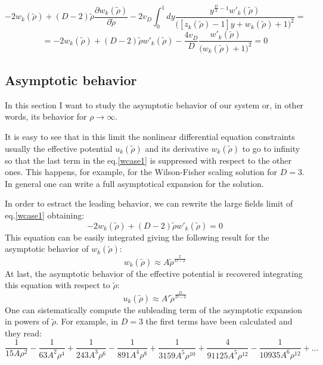 \begin{equation*}
-2 w_k(\widetilde{\rho}) + (D-2)\widetilde{\rho}\frac{\partial w_k(\widetilde{\rho})}{\partial \widetilde{\rho}} - 2v_D\int_0^1 dy \frac{y^{\frac{D}{2}-1} w'_k(\widetilde{\rho})}{\big([z_k(\widetilde{\rho}) -1 ]y + w_k(\widetilde{\rho})+1\big)^2}  = 
\end{equation*}
\begin{equation}\label{wcase1}
 = -2 w_k(\widetilde{\rho}) + (D-2)\widetilde{\rho}w'_k(\widetilde{\rho}) - \frac{4v_D}{D} \frac{w'_k(\widetilde{\rho})}{\big(w_k(\widetilde{\rho})+1\big)^2}=0
\end{equation}

\subsection{Asymptotic behavior}
In this section I want to study the asymptotic behavior of our system or, in other words, its behavior for $\rho \to \infty$. 

It is easy to see that in this limit the nonlinear differential equation constraints usually the effective potential $u_k(\widetilde{\rho})$ and its derivative $w_k(\widetilde{\rho})$ 
to go to infinity so that the last term in the eq.\eqref{wcase1} is suppressed with respect to the other ones. This happens, for example, 
for the Wilson-Fisher scaling solution for $D= 3$. In general one can write a full asymptotical expansion for the solution.

In order to estract the leading behavior, we can rewrite the large fields limit of eq.\eqref{wcase1} obtaining:
\begin{equation}\label{wasi}
-2 w_k(\widetilde{\rho}) + (D-2)\widetilde{\rho} w'_k(\widetilde{\rho}) = 0
\end{equation}
This equation can be easily integrated giving the following result for the asymptotic behavior of $ w_k(\widetilde{\rho})$:
\begin{equation}\label{wasi}
w_k(\widetilde{\rho}) \approx A \widetilde{\rho}^{\frac{2}{D -2}}
\end{equation}
At last, the asymptotic behavior of the effective potential is recovered integrating this equation with respect to $\widetilde{\rho}$:
\begin{equation}
u_k(\widetilde{\rho}) \approx A' \widetilde{\rho}^{\frac{D}{D -2}}
\end{equation}
One can sistematically compute the subleading term of the asymptotic expansion in powers of $\widetilde{\rho}$.
For example, in $D=3$ the first terms have been calculated and they read:
\begin{equation}
\frac{1}{15 A \rho ^2}-\frac{1}{63 A^2 \rho ^4}+\frac{1}{243 A^3 \rho^6}-\frac{1}{891 A^4 \rho ^8}+\frac{1}{3159 A^5 \rho ^{10}}+\frac{4}{91125 A^5 \rho ^{12}}-\frac{1}{10935 A^6 \rho ^{12}} + \dots 
\end{equation}

